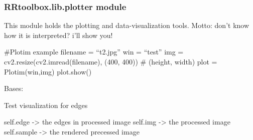 \documentclass[letterpaper,10pt,english]{sphinxmanual}
\begin{document}
\subsubsection{RRtoolbox.lib.plotter module}
\label{RRtoolbox.lib:module-RRtoolbox.lib.plotter}\label{RRtoolbox.lib:rrtoolbox-lib-plotter-module}
This module holds the plotting and data-visualization tools. Motto: don't know how it is interpreted? i'll show you!

\#Plotim example
filename = ``t2.jpg''
win = ``test''
img = cv2.resize(cv2.imread(filename), (400, 400))  \# (height, width)
plot = Plotim(win,img)
plot.show()

\begin{fulllineitems}
\label{RRtoolbox.lib:RRtoolbox.lib.plotter.Edger}
Bases: {\hyperref[RRtoolbox.lib:RRtoolbox.lib.plotter.Plotim]{\emph{}}}

Test visualization for edges

self.edge -\textgreater{} the edges in processed image
self.img -\textgreater{} the processed image
self.sample -\textgreater{} the rendered precessed image

\begin{fulllineitems}
\label{RRtoolbox.lib:RRtoolbox.lib.plotter.Edger.computeAll}
\end{fulllineitems}


\begin{fulllineitems}
\label{RRtoolbox.lib:RRtoolbox.lib.plotter.Edger.computeEdge}
\end{fulllineitems}


\begin{fulllineitems}
\label{RRtoolbox.lib:RRtoolbox.lib.plotter.Edger.getParameters}
\end{fulllineitems}


\end{fulllineitems}
\end{document}

